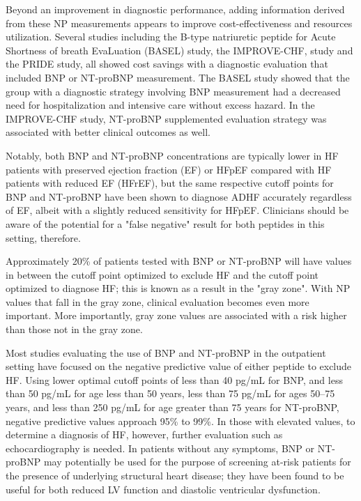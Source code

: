 \documentclass[14pt,a4paper,onecolumn]{extarticle}
\begin{document}
Beyond an improvement in diagnostic performance, adding information derived from these NP measurements appears to improve cost-effectiveness and resources utilization. Several studies including the B-type natriuretic peptide for Acute Shortness of breath EvaLuation (BASEL) study, the IMPROVE-CHF, study and the PRIDE study, all showed cost savings with a diagnostic evaluation that included BNP or NT-proBNP measurement. The BASEL study showed that the group with a diagnostic strategy involving BNP measurement had a decreased need for hospitalization and intensive care without excess hazard. In the IMPROVE-CHF study, NT-proBNP supplemented evaluation strategy was associated with better clinical outcomes as well. \citep{Gaggin2014}

Notably, both BNP and NT-proBNP concentrations are typically lower in HF patients with preserved ejection fraction (EF) or HFpEF compared with HF patients with reduced EF (HFrEF), but the same respective cutoff points for BNP and NT-proBNP have been shown to diagnose ADHF accurately regardless of EF, albeit with a slightly reduced sensitivity for HFpEF.  Clinicians should be aware of the potential for a "false negative" result for both peptides in this setting, therefore. \citep{Maisel2003}

Approximately 20\% of patients tested with BNP or NT-proBNP will have values in between the cutoff point optimized to exclude HF and the cutoff point optimized to diagnose HF; this is known as a result in the "gray zone". With NP values that fall in the gray zone, clinical evaluation becomes even more important. More importantly, gray zone values are associated with a risk higher than those not in the gray zone. \citep{van_Kimmenade2006}

Most studies evaluating the use of BNP and NT-proBNP in the outpatient setting have focused on the negative predictive value of either peptide to exclude HF. Using lower optimal cutoff points of less than 40 pg/mL for BNP, and less than 50 pg/mL for age less than 50 years, less than 75 pg/mL for ages 50–75 years, and less than 250 pg/mL for age greater than 75 years for NT-proBNP, negative predictive values approach 95\% to 99\%. In those with elevated values, to determine a diagnosis of HF, however, further evaluation such as echocardiography is needed. In patients without any symptoms, BNP or NT-proBNP may potentially be used for the purpose of screening at-risk patients for the presence of underlying structural heart disease; they have been found to be useful for both reduced LV function and diastolic ventricular dysfunction. \citep{Gaggin2014}
\end{document}
